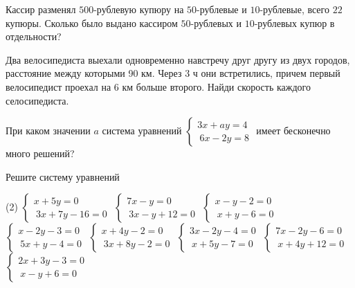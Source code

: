 \begin{class}[number=1]
\begin{listofex}
		\item Кассир разменял \( 500 \)-рублевую купюру на \( 50 \)-рублевые и \( 10 \)-рублевые, всего \( 22 \) купюры. Сколько было выдано кассиром \( 50 \)-рублевых и \( 10 \)-рублевых купюр в отдельности?
		 \item  Два велосипедиста выехали одновременно навстречу друг другу из двух городов, расстояние между которыми 90 км. Через 3 ч они встретились, причем первый велосипедист проехал на 6 км больше второго. Найди скорость каждого селосипедиста.
		 \item  При каком значении \( a \) система уравнений \( \begin{cases}
		 	3x+ay=4 \\\
		 	6x-2y=8
		 \end{cases} \) имеет бесконечно много решений?
	\end{listofex}
\end{class}

\begin{homework}[number=1]
	\begin{listofex}
		\item Решите систему уравнений \begin{tasks}(2)
			\task \( \begin{cases}
				x+5y=0 \\\
				3x+7y-16=0
			\end{cases} \)
			\task \( \begin{cases}
				7x-y=0 \\\
				3x-y+12=0
			\end{cases} \)
			\task \( \begin{cases}
				x-y-2=0 \\\
				x+y-6=0
			\end{cases} \)
			\task \( \begin{cases}
				x-2y-3=0 \\\
				5x+y-4=0
			\end{cases} \)
			\task \( \begin{cases}
				x+4y-2=0 \\\
				3x+8y-2=0
			\end{cases} \)
			\task \( \begin{cases}
				3x-2y-4=0 \\\
				x+5y-7=0
			\end{cases} \)
			\task \( \begin{cases}
				7x-2y-6=0 \\\
				x+4y+12=0
			\end{cases} \)
			\task \( \begin{cases}
				2x+3y-3=0 \\\
				x-y+6=0
			\end{cases} \)
		\end{tasks}
		
	\end{listofex}
\end{homework}

